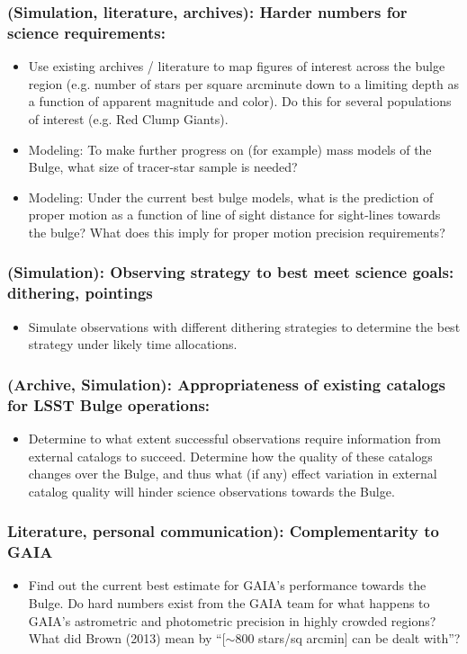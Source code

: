 \subsubsection{(Simulation, literature, archives): Harder numbers for science requirements: }
\begin{itemize}
\item{
Use existing archives / literature to map figures of interest across the bulge region (e.g. number of stars 
per square arcminute down to a limiting depth as a function of apparent magnitude and color). Do this 
for several populations of interest (e.g. Red Clump Giants). }
\item{Modeling: To make further progress on (for example) mass models of the Bulge, what size of tracer-star 
sample is needed? }
\item{Modeling: Under the current best bulge models, what is the prediction of proper motion as a function of 
line of sight distance for sight-lines towards the bulge? What does this imply for proper motion precision requirements? }
\end{itemize}


\subsubsection{(Simulation): Observing strategy to best meet science goals: dithering, pointings}
\begin{itemize}
\item{Simulate observations with different dithering strategies to determine the best strategy under likely time 
allocations.}
\end{itemize}

\subsubsection{(Archive, Simulation): Appropriateness of existing catalogs for LSST Bulge operations: }
\begin{itemize}
\item{Determine to what extent successful observations require information from external catalogs to succeed. 
Determine how the quality of these catalogs changes over the Bulge, and thus what (if any) effect variation in external catalog quality will hinder science observations towards the Bulge. }
\end{itemize}

\subsubsection{Literature, personal communication): Complementarity to GAIA }
\begin{itemize}
\item{Find out the current best estimate for GAIA’s performance towards the Bulge. Do hard numbers exist from 
the GAIA team for what happens to GAIA’s astrometric and photometric precision in highly crowded regions? What did Brown (2013) mean by “[$\sim$800 stars/sq arcmin] can be dealt with”? }
\end{itemize}

